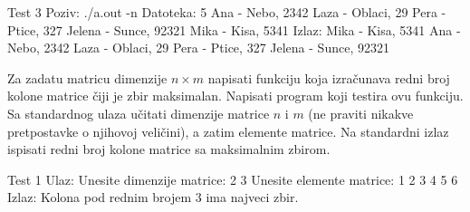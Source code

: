 \begin{Exercise}[label=333]
\begin{miditest}
\begin{test}{Test 3}
Poziv: ./a.out -n
Datoteka:  5
           Ana - Nebo, 2342
           Laza - Oblaci, 29
           Pera - Ptice, 327
           Jelena - Sunce, 92321
           Mika - Kisa, 5341
Izlaz:     Mika - Kisa, 5341
           Ana - Nebo, 2342
           Laza - Oblaci, 29
           Pera - Ptice, 327
           Jelena - Sunce, 92321		   
\end{test}
\end{miditest}
\end{Exercise}
\begin{Answer}[ref=333]
\end{Answer}

\begin{Exercise}[label=336]
Za zadatu matricu dimenzije $n \times m$ napisati funkciju koja
izračunava redni broj kolone matrice čiji je zbir
maksimalan. Napisati program koji testira ovu funkciju. Sa
standardnog ulaza učitati dimenzije matrice $n$ i
$m$ (ne praviti nikakve pretpostavke o njihovoj veličini), 
a zatim elemente matrice. Na standardni izlaz ispisati 
redni broj kolone matrice sa maksimalnim zbirom.

\begin{maxitest}
\begin{test}{Test 1}
Ulaz:  Unesite dimenzije matrice:
       2 3
       Unesite elemente matrice:
       1 2 3
       4 5 6
Izlaz: Kolona pod rednim brojem 3 ima najveci zbir.		   
\end{test}
\end{maxitest}
\end{Exercise}
\begin{Answer}[ref=336]
\end{Answer}

